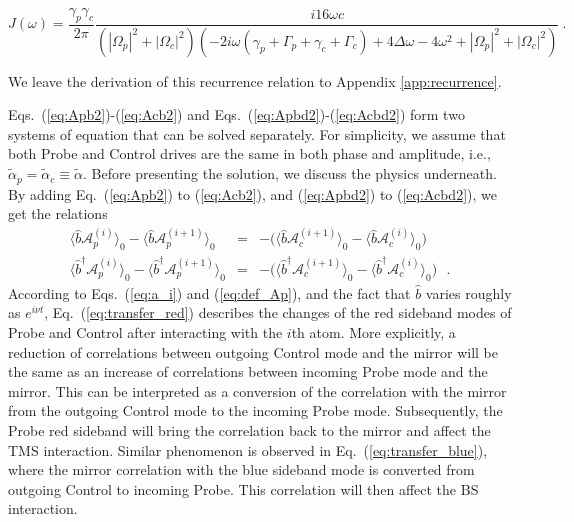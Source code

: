 \documentclass[aps, pra, reprint, amsmath, amssymb, groupedaddress, acknowledgments]{revtex4-1}
\begin{document}
\begin{widetext}
\begin{equation}
J(\omega) = \frac{\gamma_p \gamma_c}{2\pi} \frac{ i 16 \omega c}{(|\Omega_p|^2+|\Omega_c|^2)(-2 i \omega (\gamma_p + \Gamma_p + \gamma_c + \Gamma_c) +4 \Delta \omega -4 \omega^2 + |\Omega_p|^2+|\Omega_c|^2)}~. \label{eq:J_exp}
\end{equation}
\end{widetext}
We leave the derivation of this recurrence relation to Appendix \ref{app:recurrence}.  


Eqs.~(\ref{eq:Apb2})-(\ref{eq:Acb2}) and Eqs.~(\ref{eq:Apbd2})-(\ref{eq:Acbd2}) form two systems of equation that can be solved separately.  For simplicity, we assume that both Probe and Control drives are the same in both phase and amplitude, i.e., $\tilde{\alpha}_p=\tilde{\alpha}_c\equiv\tilde{\alpha}$.
Before presenting the solution, we discuss the physics underneath.  By adding Eq.~(\ref{eq:Apb2}) to (\ref{eq:Acb2}), and (\ref{eq:Apbd2}) to (\ref{eq:Acbd2}), we get the relations
\begin{eqnarray}\label{eq:transfer_red}
\langle \hat{b} \mathcal{A}_p^{(i)} \rangle_0 - \langle \hat{b} \mathcal{A}_p^{(i+1)} \rangle_0 &=& - \big(\langle \hat{b} \mathcal{A}_c^{(i+1)} \rangle_0 - \langle \hat{b} \mathcal{A}_c^{(i)} \rangle_0 \big) \\
\langle \hat{b}^\dag \mathcal{A}_p^{(i)} \rangle_0 - \langle \hat{b}^\dag \mathcal{A}_p^{(i+1)} \rangle_0 &=& - \big(\langle \hat{b}^\dag \mathcal{A}_c^{(i+1)} \rangle_0 - \langle \hat{b}^\dag \mathcal{A}_c^{(i)} \rangle_0 \big)~~~.\label{eq:transfer_blue}
\end{eqnarray}
According to Eqs.~(\ref{eq:a_i}) and (\ref{eq:def_Ap}), and the fact that $\hat{b}$ varies roughly as $e^{i \nu t}$, Eq.~(\ref{eq:transfer_red}) describes the changes of the red sideband modes of Probe and Control after interacting with the $i$th atom.  More explicitly, a reduction of correlations between outgoing Control mode and the mirror will be the same as an increase of correlations between incoming Probe mode and the mirror.  This can be interpreted as a conversion of the correlation with the mirror from the outgoing Control mode to the incoming Probe mode.  Subsequently, the Probe red sideband will bring the correlation back to the mirror and affect the TMS interaction.
Similar phenomenon is observed in Eq.~(\ref{eq:transfer_blue}), where the mirror correlation with the blue sideband mode is converted from outgoing Control to incoming Probe.  This correlation will then affect the BS interaction. 
\end{document}
